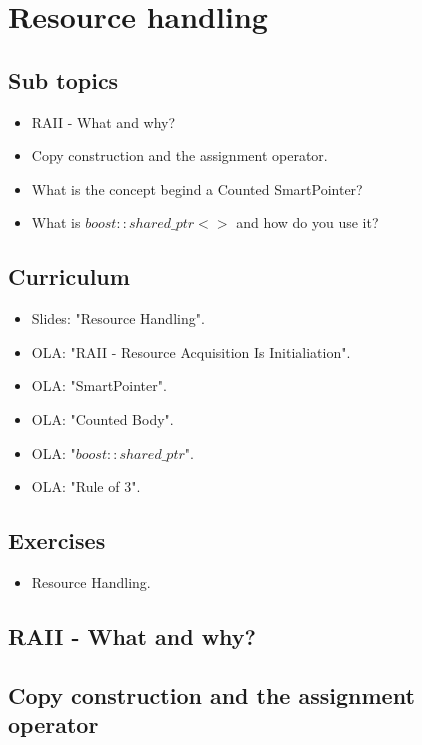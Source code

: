 \section{Resource handling}

\subsection{Sub topics}

\begin{itemize}
	\item RAII - What and why?
	\item Copy construction and the assignment operator.
	\item What is the concept begind a Counted SmartPointer?
	\item What is $boost::shared\_ptr<>$ and how do you use it?
\end{itemize}

\subsection{Curriculum}

\begin{itemize}
	\item Slides: "Resource Handling".
	\item OLA: "RAII - Resource Acquisition Is Initialiation".
	\item OLA: "SmartPointer".
	\item OLA: "Counted Body".
	\item OLA: "$boost::shared\_ptr$".
	\item OLA: "Rule of 3".
\end{itemize}

\subsection{Exercises}

\begin{itemize}
	\item Resource Handling.
\end{itemize}

\subsection{RAII - What and why?}

\subsection{Copy construction and the assignment operator}

